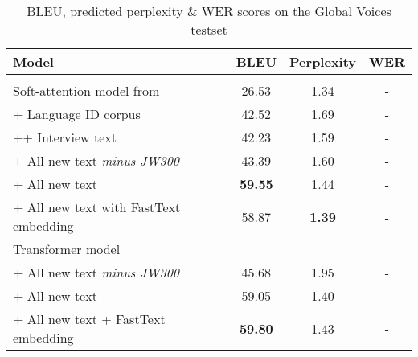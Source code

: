 \documentclass{article} %
\begin{document}
 \begin{table}[h]
  \caption{BLEU, predicted perplexity \& WER scores on the Global Voices testset}
  \label{tab:results-appendix}
 \begin{center}
  \begin{tabular}{lccc}
    \toprule
    \textbf{Model} & \textbf{BLEU} &\textbf{Perplexity} &\textbf{WER}\\
    \bottomrule
    \\
    Soft-attention model from \citep{orife2018adr} & 26.53 & 1.34 & -\\
    \midrule
	\hspace{5mm} + Language ID corpus & 42.52 & 1.69 & -\\ 
	\hspace{10mm} ++ Interview text & 42.23 & 1.59 & -\\
	\hspace{5mm} + All new text \it{minus} JW300 & 43.39 & 1.60 & -\\ 
	\hspace{5mm} + All new text & \textbf{59.55} & 1.44 & -\\ 
	\hspace{5mm} + All new text with FastText embedding & 58.87 & \textbf{1.39} & -\\ 
    \midrule
	Transformer model \\
	 \hspace{5mm} + All new text \it{minus} JW300 & 45.68 & 1.95 & -\\
	 \hspace{5mm} + All new text & 59.05 & 1.40 & -\\
	 \hspace{5mm} + All new text + FastText embedding & \textbf{59.80} & 1.43 & -\\ 
    \bottomrule
  \end{tabular}
  \end{center}
\end{table}
\end{document}
